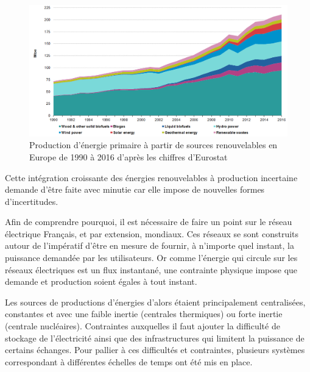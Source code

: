 \documentclass[12pt]{report}
\begin{document}
\begin{figure}[h]
	\begin{center}
		\includegraphics[width = \linewidth]{Images/Intro/Primary_production_of_energy_1990-2016.png}
		\caption{Production d'énergie primaire à partir de sources renouvelables en Europe de 1990 à 2016 d'après les chiffres d'Eurostat}
		\label{fig:Intro_EnergyProduction}
	\end{center}
\end{figure}

Cette intégration croissante des énergies renouvelables à production incertaine demande d'être faite avec minutie car elle impose de nouvelles formes d'incertitudes. %

Afin de comprendre pourquoi, il est nécessaire de faire un point sur le réseau électrique Français, et par extension, mondiaux. Ces réseaux se sont construits autour de l'impératif d'être en mesure de fournir, à n'importe quel instant, la puissance demandée par les utilisateurs. Or comme l'énergie qui circule sur les réseaux électriques est un flux instantané, une contrainte physique impose que demande et production soient égales à tout instant.

Les sources de productions d'énergies d'alors étaient principalement centralisées, constantes et avec une faible inertie (centrales thermiques) ou forte inertie (centrale nucléaires).  Contraintes auxquelles il faut ajouter la difficulté de stockage de l'électricité ainsi que des infrastructures qui limitent la puissance de certains échanges. Pour pallier à ces difficultés et contraintes, plusieurs systèmes correspondant à différentes échelles de temps ont été mis en place.

\end{document}

